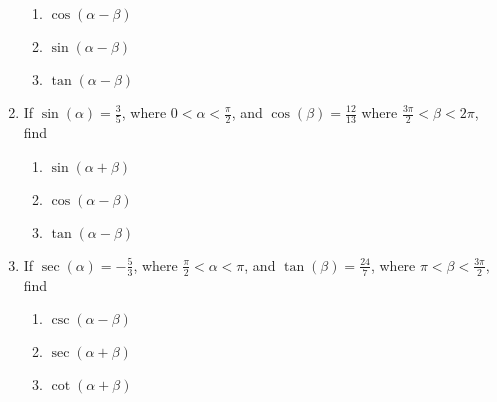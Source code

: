 \documentclass{ximera}
\begin{document}
\begin{enumerate}
\begin{multicols}{3}
\begin{enumerate}
\end{enumerate}

\end{multicols}

\begin{multicols}{3}

\begin{enumerate}

\setcounter{enumii}{\value{HWindent}}

\item  $\cos(\alpha - \beta)$
\item  $\sin(\alpha - \beta)$
\item  $\tan(\alpha - \beta)$

\end{enumerate}

\end{multicols}

\item If $\sin(\alpha) = \frac{3}{5}$, where $0 < \alpha < \frac{\pi}{2}$, and $\cos(\beta) = \frac{12}{13}$ where $\frac{3\pi}{2} < \beta < 2\pi$, find 

\begin{multicols}{3}

\begin{enumerate}

\item $\sin(\alpha + \beta)$
\item $\cos(\alpha - \beta)$
\item $\tan(\alpha - \beta)$

\end{enumerate}

\end{multicols}



\item If $\sec(\alpha) = -\frac{5}{3}$, where $\frac{\pi}{2} < \alpha < \pi$, and $\tan(\beta) = \frac{24}{7}$, where $\pi < \beta < \frac{3\pi}{2}$, find

\begin{multicols}{3}

\begin{enumerate}

\item $\csc(\alpha - \beta)$
\item $\sec(\alpha + \beta)$
\item $\cot(\alpha + \beta)$

\end{enumerate}

\end{multicols}

\setcounter{HW}{\value{enumi}}

\end{enumerate}
\end{document}
